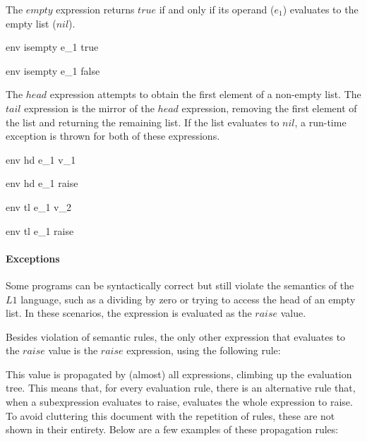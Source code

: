\documentclass{article}
\begin{document}
The $empty$ expression returns $true$ if and only if its operand ($e_1$) evaluates to the empty list ($nil$).

    {\mbox{env} \vdash isempty \; e_1 \Downarrow true}
    
    {\mbox{env} \vdash isempty \; e_1 \Downarrow false}

The $head$ expression attempts to obtain the first element of a non-empty list.
The $tail$ expression is the mirror of the $head$ expression, removing the first element of the list and returning the remaining list.
If the list evaluates to $nil$, a run-time exception is thrown for both of these expressions.

    {\mbox{env} \vdash hd \; e_1 \Downarrow v_1}

    {\mbox{env} \vdash hd \; e_1 \Downarrow raise}
        
    {\mbox{env} \vdash tl \; e_1 \Downarrow v_2}

    {\mbox{env} \vdash tl \; e_1 \Downarrow raise}
    
\paragraph{Exceptions}

Some programs can be syntactically correct but still violate the semantics of the $L1$ language, such as a dividing by zero or trying to access the head of an empty list.
In these scenarios, the expression is evaluated as the $raise$ value. 

Besides violation of semantic rules, the only other expression that evaluates to the $raise$ value is the $raise$ expression, using the following rule:


This value is propagated by (almost) all expressions, climbing up the evaluation tree.
This means that, for every evaluation rule, there is an alternative rule that, when a subexpression evaluates to raise, evaluates the whole expression to raise.
To avoid cluttering this document with the repetition of rules, these are not shown in their entirety. 
Below are a few examples of these propagation rules:
\end{document}
